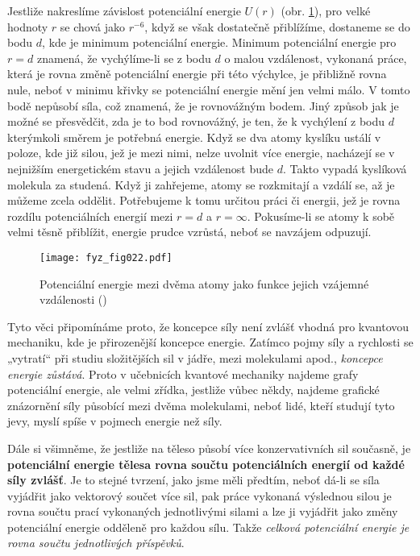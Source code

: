 {    Jestliže nakreslíme závislost potenciální energie \(U(r)\) (obr. \ref{fyz:fig022}), pro velké 
    hodnoty \(r\) se chová jako \(r^{-6}\), když se však dostatečně přiblížíme, dostaneme se do 
    bodu \(d\), kde je minimum potenciální energie. Minimum potenciální energie pro \(r=d\) 
    znamená, že vychýlíme-li se z bodu \(d\) o malou vzdálenost, vykonaná práce, která je rovna 
    změně potenciální energie při této výchylce, je přibližně rovna nule, neboť v minimu křivky se 
    potenciální energie mění jen velmi málo. V tomto bodě nepůsobí síla, což znamená, že je 
    rovnovážným bodem. Jiný způsob jak je možné se přesvědčit, zda je to bod rovnovážný, je ten, že 
    k vychýlení z bodu \(d\) kterýmkoli směrem je potřebná energie. Když se dva atomy kyslíku 
    ustálí v poloze, kde již silou, jež je mezi nimi, nelze uvolnit více energie, nacházejí se v 
    nejnižším energetickém stavu a jejich vzdálenost bude \(d\). Takto vypadá kyslíková molekula za 
    studená. Když ji zahřejeme, atomy se rozkmitají a vzdálí se, až je můžeme zcela oddělit. 
    Potřebujeme k tomu určitou práci či energii, jež je rovna rozdílu potenciálních energií mezi 
    \(r = d\) a \(r=\infty\). Pokusíme-li se atomy k sobě velmi těsně přiblížit, energie prudce 
    vzrůstá, neboť se navzájem odpuzují.    
    
    \begin{figure}[ht!]  %
      \centering
      \texttt{[image: fyz\_fig022.pdf]}
      \caption{Potenciální energie mezi dvěma atomy jako funkce jejich vzájemné vzdálenosti 
               (\cite[s.~202]{Feynman01})}
      \label{fyz:fig022}
    \end{figure}
    Tyto věci připomínáme proto, že koncepce síly není zvlášť vhodná pro kvantovou mechaniku, kde 
    je přirozenější koncepce energie. Zatímco pojmy síly a rychlosti se „vytratí“ při studiu 
    složitějších sil v jádře, mezi molekulami apod., \emph{koncepce energie zůstává}. Proto v 
    učebnicích kvantové mechaniky najdeme grafy potenciální energie, ale velmi zřídka, jestliže 
    vůbec někdy, najdeme grafické znázornění síly působící mezi dvěma molekulami, neboť lidé, kteří 
    studují tyto jevy, myslí spíše v pojmech energie než síly.
    
    Dále si všimněme, že jestliže na těleso působí více konzervativních sil současně, je 
    \textbf{potenciální energie tělesa rovna součtu potenciálních energií od každé síly zvlášť}. Je 
    to stejné tvrzení, jako jsme měli předtím, neboť dá-li se síla vyjádřit jako vektorový součet 
    více sil, pak práce vykonaná výslednou silou je rovna součtu prací vykonaných jednotlivými 
    silami a lze ji vyjádřit jako změny potenciální energie odděleně pro každou sílu. Takže 
    \emph{celková potenciální energie je rovna součtu jednotlivých příspěvků}.
    
}
